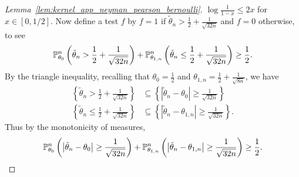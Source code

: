 \begin{proof}[Lemma~\ref{lem:kernel_app_neyman_pearson_bernoulli}]
  $\log \frac{1}{1-x} \leq 2x$
  for $x \in [0,1/2]$.
  Now define a test $f$ by
  $f = 1$ if $\tilde \theta_n > \frac{1}{2} + \frac{1}{\sqrt{32n}}$
  and $f=0$ otherwise,
  to see
  \begin{align*}
    \P_{\theta_0}^n \left(
      \tilde \theta_n > \frac{1}{2} + \frac{1}{\sqrt{32n}}
    \right)
    + \P_{\theta_{1,n}}^n \left(
      \tilde \theta_n \leq \frac{1}{2} + \frac{1}{\sqrt{32n}}
    \right)
    \geq \frac{1}{2}.
  \end{align*}
  By the triangle inequality,
  recalling that
  $\theta_0 = \frac{1}{2}$
  and $\theta_{1,n} = \frac{1}{2} + \frac{1}{\sqrt{8n}}$,
  we have
  \begin{align*}
    \left\{
      \tilde \theta_n > \frac{1}{2} + \frac{1}{\sqrt{32n}}
    \right\}
    &\subseteq
    \left\{
      \left| \tilde \theta_n - \theta_0 \right|
      \geq \frac{1}{\sqrt{32n}}
    \right\} \\
    \left\{
      \tilde \theta_n \leq \frac{1}{2} + \frac{1}{\sqrt{32n}}
    \right\}
    &\subseteq
    \left\{
      \left| \tilde \theta_n - \theta_{1,n} \right|
      \geq \frac{1}{\sqrt{32n}}
    \right\}.
  \end{align*}
  Thus by the monotonicity of measures,
  \begin{align*}
    \P_{\theta_0}^n \left(
      \big| \tilde \theta_n - \theta_0 \big|
      \geq \frac{1}{\sqrt{32n}}
    \right)
    + \P_{\theta_{1,n}}^n \left(
      \big| \tilde \theta_n - \theta_{1,n} \big|
      \geq \frac{1}{\sqrt{32n}}
    \right)
    \geq \frac{1}{2}.
  \end{align*}
\end{proof}

